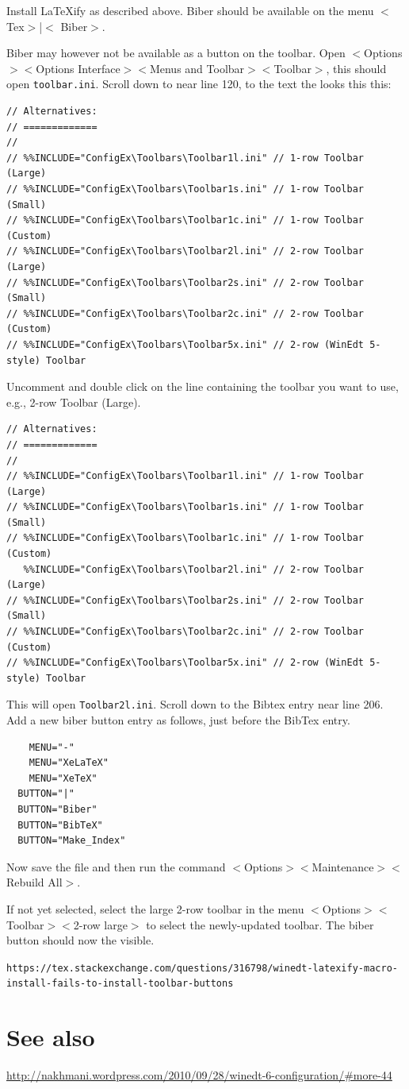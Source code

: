 Install LaTeXify as described above. Biber should be available on the menu $<$ Tex$>$|$<$ Biber$>$.

Biber may however not be available as a button on the toolbar. Open
$<$Options$>$$<$Options Interface$>$$<$Menus and Toolbar$>$$<$Toolbar$>$, this should open \lstinline{toolbar.ini}.
Scroll down to near line 120, to the text the looks this this:

\begin{lstlisting}
// Alternatives:
// =============
//
// %%INCLUDE="ConfigEx\Toolbars\Toolbar1l.ini" // 1-row Toolbar (Large)
// %%INCLUDE="ConfigEx\Toolbars\Toolbar1s.ini" // 1-row Toolbar (Small)
// %%INCLUDE="ConfigEx\Toolbars\Toolbar1c.ini" // 1-row Toolbar (Custom)
// %%INCLUDE="ConfigEx\Toolbars\Toolbar2l.ini" // 2-row Toolbar (Large)
// %%INCLUDE="ConfigEx\Toolbars\Toolbar2s.ini" // 2-row Toolbar (Small)
// %%INCLUDE="ConfigEx\Toolbars\Toolbar2c.ini" // 2-row Toolbar (Custom)
// %%INCLUDE="ConfigEx\Toolbars\Toolbar5x.ini" // 2-row (WinEdt 5-style) Toolbar
\end{lstlisting}

Uncomment and double click on the line containing the toolbar you want to use, e.g.,  2-row Toolbar (Large).

\begin{lstlisting}
// Alternatives:
// =============
//
// %%INCLUDE="ConfigEx\Toolbars\Toolbar1l.ini" // 1-row Toolbar (Large)
// %%INCLUDE="ConfigEx\Toolbars\Toolbar1s.ini" // 1-row Toolbar (Small)
// %%INCLUDE="ConfigEx\Toolbars\Toolbar1c.ini" // 1-row Toolbar (Custom)
   %%INCLUDE="ConfigEx\Toolbars\Toolbar2l.ini" // 2-row Toolbar (Large)
// %%INCLUDE="ConfigEx\Toolbars\Toolbar2s.ini" // 2-row Toolbar (Small)
// %%INCLUDE="ConfigEx\Toolbars\Toolbar2c.ini" // 2-row Toolbar (Custom)
// %%INCLUDE="ConfigEx\Toolbars\Toolbar5x.ini" // 2-row (WinEdt 5-style) Toolbar
\end{lstlisting}

This will open \lstinline{Toolbar2l.ini}. Scroll down to the Bibtex entry near line 206.  Add a new biber button entry as follows, just before the BibTex entry.

\begin{lstlisting}
    MENU="-"
    MENU="XeLaTeX"
    MENU="XeTeX"
  BUTTON="|"
  BUTTON="Biber"
  BUTTON="BibTeX"
  BUTTON="Make_Index"
\end{lstlisting}

Now save the file and then run the command $<$Options$>$$<$Maintenance$>$$<$Rebuild All$>$.

If not yet selected, select the large 2-row toolbar in the menu
$<$Options$>$$<$Toolbar$>$$<$2-row large$>$ to select the newly-updated toolbar.  The biber button should now the visible.


\lstinline{https://tex.stackexchange.com/questions/316798/winedt-latexify-macro-install-fails-to-install-toolbar-buttons}

\section{See also}

\url{http://nakhmani.wordpress.com/2010/09/28/winedt-6-configuration/#more-44}
